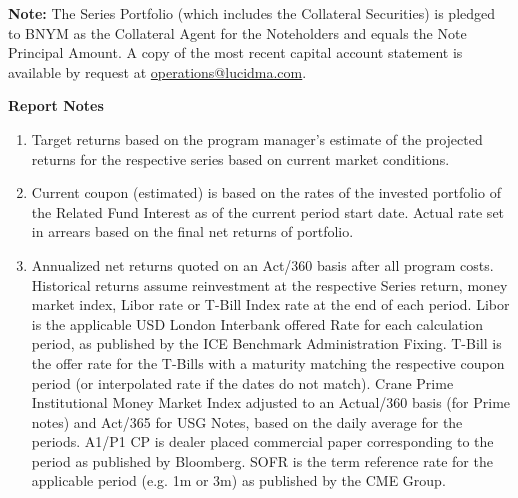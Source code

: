 \documentclass[9pt]{article}
\begin{document}
\begin{center}
{\begin{tabular}
    \end{tabular}
    }\end{center}


    {\small
    \color{gray}
    \noindent\textbf{Note:}  The Series Portfolio (which includes the Collateral Securities) is pledged to BNYM as the Collateral Agent for the Noteholders and equals the Note Principal Amount. A copy of the most recent capital account statement is available by request at \underline{operations@lucidma.com}.
    }

    \pagebreak

    \footnotesize
    \noindent\textbf{\color{lucid_blue}Report Notes}

    \begin{enumerate}
        \item Target returns based on the program manager's estimate of the projected returns for the respective series based on current market conditions.

        \item Current coupon (estimated) is based on the rates of the invested portfolio of the Related Fund Interest as of the current period start date. Actual rate set in arrears based on the final net returns of portfolio.

        \item Annualized net returns quoted on an Act/360 basis after all program costs. Historical returns assume reinvestment at the respective Series return, money market index, Libor rate or T-Bill Index rate at the end of each period. Libor is the applicable USD London Interbank offered Rate for each calculation period, as published by the ICE Benchmark Administration Fixing. T-Bill is the offer rate for the T-Bills with a maturity matching the respective coupon period (or interpolated rate if the dates do not match). Crane Prime Institutional Money Market Index adjusted to an Actual/360 basis (for Prime notes) and Act/365 for USG Notes, based on the daily average for the periods. A1/P1 CP is dealer placed commercial paper corresponding to the period as published by Bloomberg. SOFR is the term reference rate for the applicable period (e.g. 1m or 3m) as published by the CME Group.


\end{enumerate}
\end{document}
